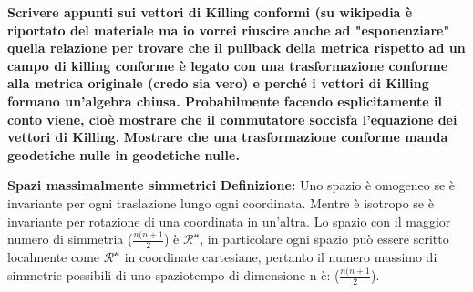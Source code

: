 \documentclass[10pt,a4paper]{article}
\begin{document}
\textbf{Scrivere appunti sui vettori di Killing conformi (su wikipedia è riportato del materiale ma io vorrei riuscire anche ad "esponenziare" quella relazione per trovare che il pullback della metrica rispetto ad un campo di killing conforme è legato con una trasformazione conforme alla metrica originale (credo sia vero) e perché i vettori di Killing formano un'algebra chiusa. Probabilmente facendo esplicitamente il conto viene, cioè mostrare che il commutatore soccisfa l'equazione dei vettori di Killing.}
\textbf{Mostrare che una trasformazione conforme manda geodetiche nulle in geodetiche nulle.}


\textbf{Spazi massimalmente simmetrici}
\textbf{Definizione:} Uno spazio è omogeneo se è invariante per ogni traslazione lungo ogni coordinata. Mentre è isotropo se è invariante per rotazione di una coordinata in un'altra.
Lo spazio con il maggior numero di simmetria ($\frac{n(n+1}{2}$) è $\mathcal{R^{n}}$, in particolare ogni spazio può essere scritto localmente come $\mathcal{R^{n}}$ in coordinate cartesiane, pertanto il numero massimo di simmetrie possibili di uno spaziotempo di dimensione n è: ($\frac{n(n+1}{2}$).
\end{document}
